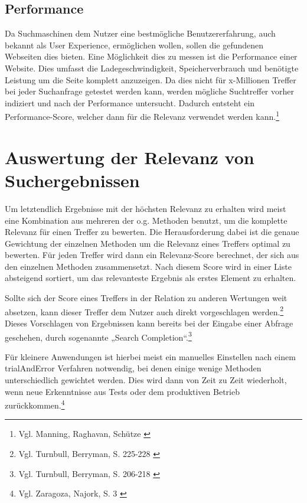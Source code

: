 \subsection{Performance}
\label{sub:relevancePerformance}
Da Suchmaschinen dem Nutzer eine bestmögliche Benutzererfahrung, auch bekannt als User Experience, ermöglichen wollen, sollen die gefundenen Webseiten dies bieten. Eine Möglichkeit dies zu messen ist die Performance einer Website.
Dies umfasst die Ladegeschwindigkeit, Speicherverbrauch und benötigte Leistung um die Seite komplett anzuzeigen.
Da dies nicht für x-Millionen Treffer bei jeder Suchanfrage getestet werden kann, werden mögliche Suchtreffer vorher indiziert und nach der Performance untersucht.
Dadurch entsteht ein Performance-Score, welcher dann für die Relevanz verwendet werden kann.\footnote{Vgl. Manning, Raghavan, Schütze \cite{manning2008}}

\section{Auswertung der Relevanz von Suchergebnissen}
\label{sec:relevanceScore}
Um letztendlich Ergebnisse mit der höchsten Relevanz zu erhalten wird meist eine Kombination aus mehreren der o.g. Methoden benutzt, um die komplette Relevanz für einen Treffer zu bewerten.
Die Herausforderung dabei ist die genaue Gewichtung der einzelnen Methoden um die Relevanz eines Treffers optimal zu bewerten.
Für jeden Treffer wird dann ein Relevanz-Score berechnet, der sich aus den einzelnen Methoden zusammensetzt. Nach diesem Score wird in einer Liste absteigend sortiert, um das relevanteste Ergebnis als erstes Element zu erhalten.

Sollte sich der Score eines Treffers in der Relation zu anderen Wertungen weit absetzen, kann dieser Treffer dem Nutzer auch direkt vorgeschlagen werden.\footnote{Vgl. Turnbull, Berryman, S. 225-228 \cite{turnbull2016}} Dieses Vorschlagen von Ergebnissen kann bereits bei der Eingabe einer Abfrage geschehen, durch sogenannte „Search Completion“.\footnote{Vgl. Turnbull, Berryman, S. 206-218 \cite{turnbull2016}}

Für kleinere Anwendungen ist hierbei meist ein manuelles Einstellen nach einem \gls{trialAndError} Verfahren notwendig, bei denen einige wenige Methoden unterschiedlich gewichtet werden.
Dies wird dann von Zeit zu Zeit wiederholt, wenn neue Erkenntnisse aus Tests oder dem produktiven Betrieb zurückkommen.\footnote{Vgl. Zaragoza, Najork, S. 3 \cite{zaragoza2018}}

